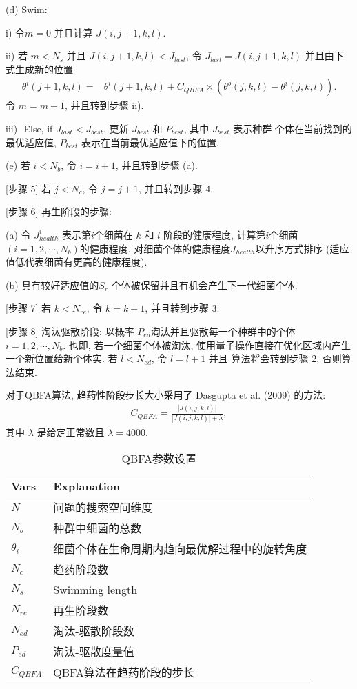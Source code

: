 \quad\quad (d) Swim:

\quad\quad \quad i) 令$m=0$ 并且计算 $J(i,j+1,k,l)$.

\quad\quad \quad ii) 若 $m<N_s$ 并且 $J(i, j+1, k, l)<J_{last}$, 令 $J_{last}=J(i, j+1, k, l)$ 并且由下式生成新的位置
\begin{align}
  \theta^i(j+1,k,l)=&\theta^i(j+1,k,l)+C_{QBFA}
  \times(\theta^b(j,k,l)-\theta^i(j,k,l)).
\end{align}
令 $m=m+1$, 并且转到步骤 ii).

\quad\quad \quad iii)\,\, \textcolor[rgb]{0,0,1}{Else, if} $J_{last}<J_{best}$, 更新 $J_{best}$ 和 $P_{best}$, 其中 $J_{best}$ 表示种群 个体在当前找到的最优适应值, $P_{best}$ 表示在当前最优适应值下的位置.

\quad\quad (e) 若 $i<N_b$, 令 $i=i+1$, 并且转到步骤 (a).

[步骤 5] 若 $j<N_c$, 令 $j=j+1$, 并且转到步骤 4.

[步骤 6] 再生阶段的步骤:

\quad\quad (a) 令 $J_{health}^i$ 表示第$i$个细菌在 $k$ 和 $l$ 阶段的健康程度, 计算第$i$个细菌 $(i=1, 2, \cdots, N_b)$的健康程度.
对细菌个体的健康程度$J_{health}$以升序方式排序 (适应值低代表细菌有更高的健康程度).

\quad\quad (b) 具有较好适应值的$S_r$ 个体被保留并且有机会产生下一代细菌个体.

[步骤 7] 若 $k<N_{re}$, 令 $k=k+1$, 并且转到步骤 3.

[步骤 8] 淘汰驱散阶段: 以概率 $P_{ed}$淘汰并且驱散每一个种群中的个体 $i=1,2,\cdots, N_b$. 也即, 若一个细菌个体被淘汰, 使用量子操作直接在优化区域内产生一个新位置给新个体实.
若 $l<N_{ed}$, 令 $l=l+1$ 并且 算法将会转到步骤 2, 否则算法结束.

对于QBFA算法, 趋药性阶段步长大小采用了 Dasgupta et al. (2009) 的方法:
\begin{align}
    C_{QBFA}=\frac{|J(i,j,k,l)|}{|J(i,j,k,l)|+\lambda},
\end{align}
其中 $\lambda$ 是给定正常数且 $\lambda=4000$.
\begin{table}
\begin{center}
\caption{QBFA参数设置}
\vspace{0.5em}
\centering
\begin{tabularx}{0.72\textwidth}{p{1.05cm}p{9.16cm}}
\hline
Vars &  Explanation\\
\hline
$N$&    问题的搜索空间维度\\
$N_b$&  种群中细菌的总数\\
$\theta_{i\cdot}$&  细菌个体在生命周期内趋向最优解过程中的旋转角度\\
$N_{c}$&  趋药阶段数\\
$N_s$&  Swimming length\\
$N_{re}$&  再生阶段数\\
$N_{ed}$&  淘汰-驱散阶段数\\
$P_{ed}$&  淘汰-驱散度量值\\
$C_{QBFA}$&   QBFA算法在趋药阶段的步长\\
\hline
\end{tabularx}
\label{Para_QBFASys20150225}
\end{center}
\end{table}
